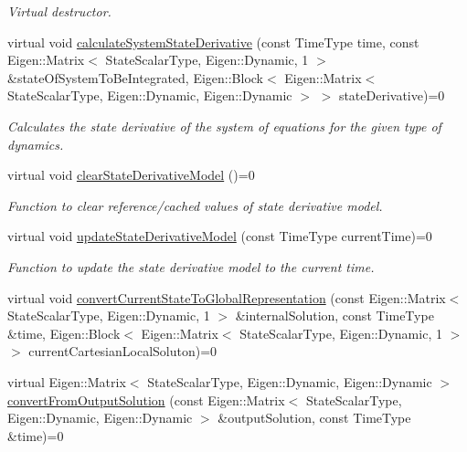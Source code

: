 \begin{DoxyCompactItemize}
\begin{DoxyCompactList}\small\item\em Virtual destructor. \end{DoxyCompactList}\item 
virtual void \hyperlink{classtudat_1_1propagators_1_1SingleStateTypeDerivative_ae3f4427ef5aee571271cbaa23bda3cb1}{calculate\+System\+State\+Derivative} (const Time\+Type time, const Eigen\+::\+Matrix$<$ State\+Scalar\+Type, Eigen\+::\+Dynamic, 1 $>$ \&state\+Of\+System\+To\+Be\+Integrated, Eigen\+::\+Block$<$ Eigen\+::\+Matrix$<$ State\+Scalar\+Type, Eigen\+::\+Dynamic, Eigen\+::\+Dynamic $>$ $>$ state\+Derivative)=0
\begin{DoxyCompactList}\small\item\em Calculates the state derivative of the system of equations for the given type of dynamics. \end{DoxyCompactList}\item 
virtual void \hyperlink{classtudat_1_1propagators_1_1SingleStateTypeDerivative_a39840fb71c86fcc5e70804dd6aa7683b}{clear\+State\+Derivative\+Model} ()=0
\begin{DoxyCompactList}\small\item\em Function to clear reference/cached values of state derivative model. \end{DoxyCompactList}\item 
virtual void \hyperlink{classtudat_1_1propagators_1_1SingleStateTypeDerivative_a9542fa3986fabe6129f0bf5b788daeba}{update\+State\+Derivative\+Model} (const Time\+Type current\+Time)=0
\begin{DoxyCompactList}\small\item\em Function to update the state derivative model to the current time. \end{DoxyCompactList}\item 
virtual void \hyperlink{classtudat_1_1propagators_1_1SingleStateTypeDerivative_ac1f76ef281c53cccc0ea66a12973b916}{convert\+Current\+State\+To\+Global\+Representation} (const Eigen\+::\+Matrix$<$ State\+Scalar\+Type, Eigen\+::\+Dynamic, 1 $>$ \&internal\+Solution, const Time\+Type \&time, Eigen\+::\+Block$<$ Eigen\+::\+Matrix$<$ State\+Scalar\+Type, Eigen\+::\+Dynamic, 1 $>$ $>$ current\+Cartesian\+Local\+Soluton)=0
\item 
virtual Eigen\+::\+Matrix$<$ State\+Scalar\+Type, Eigen\+::\+Dynamic, Eigen\+::\+Dynamic $>$ \hyperlink{classtudat_1_1propagators_1_1SingleStateTypeDerivative_ad12197357ad23bc815274f69c0c9a6c3}{convert\+From\+Output\+Solution} (const Eigen\+::\+Matrix$<$ State\+Scalar\+Type, Eigen\+::\+Dynamic, Eigen\+::\+Dynamic $>$ \&output\+Solution, const Time\+Type \&time)=0

\end{DoxyCompactItemize}
